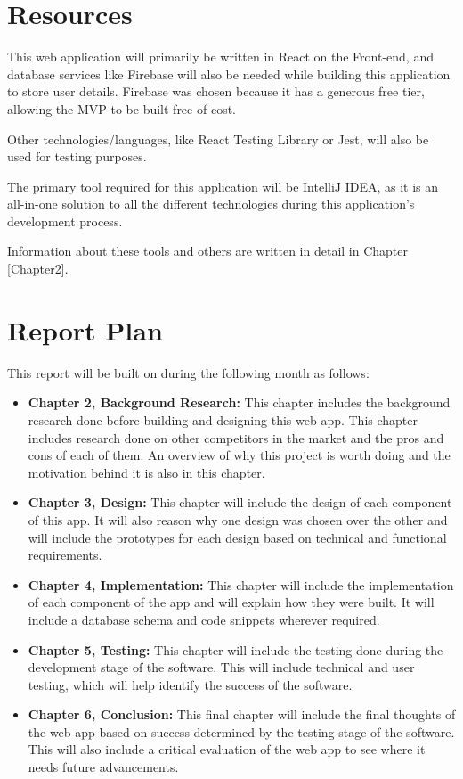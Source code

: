 \section{Resources}
This web application will primarily be written in React on the Front-end, and database services like Firebase will also be needed while building this application to store user details. Firebase was chosen because it has a generous free tier, allowing the MVP to be built free of cost. 

Other technologies/languages, like React Testing Library or Jest, will also be used for testing purposes.

The primary tool required for this application will be IntelliJ IDEA, as it is an all-in-one solution to all the different technologies during this application's development process. 

Information about these tools and others are written in detail in Chapter \ref{Chapter2}.

\section{Report Plan}
This report will be built on during the following month as follows:
\begin{itemize}
    \item \textbf{Chapter 2, Background Research:} This chapter includes the background research done before building and designing this web app. This chapter includes research done on other competitors in the market and the pros and cons of each of them. An overview of why this project is worth doing and the motivation behind it is also in this chapter.
    \item \textbf{Chapter 3, Design:} This chapter will include the design of each component of this app. It will also reason why one design was chosen over the other and will include the prototypes for each design based on technical and functional requirements.
    \item \textbf{Chapter 4, Implementation:} This chapter will include the implementation of each component of the app and will explain how they were built. It will include a database schema and code snippets wherever required.
    \item \textbf{Chapter 5, Testing:} This chapter will include the testing done during the development stage of the software. This will include technical and user testing, which will help identify the success of the software.
    \item \textbf{Chapter 6, Conclusion:} This final chapter will include the final thoughts of the web app based on success determined by the testing stage of the software. This will also include a critical evaluation of the web app to see where it needs future advancements.
\end{itemize}

